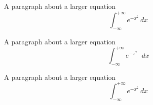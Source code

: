 \documentclass{article}
\newcommand{\diff}{\mathop{}\!d} %
\begin{document}
A paragraph about a larger equation
\[
\int_{-\infty}^{+\infty} e^{-x^2} \, dx
\]

A paragraph about a larger equation
\[
\int_{-\infty}^{+\infty} e^{-x^2} \diff x
\]

A paragraph about a larger equation
\begin{equation}
\int_{-\infty}^{+\infty} e^{-x^2} \, dx
\end{equation}
\end{document}
